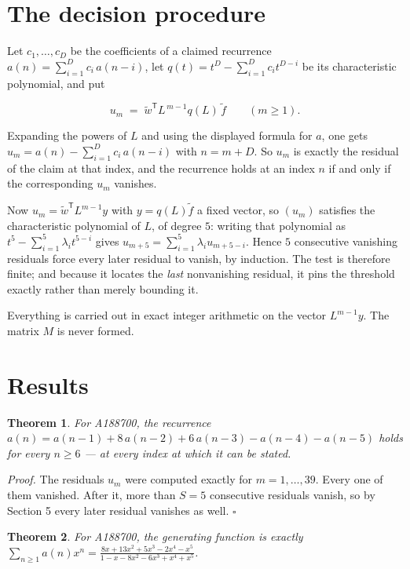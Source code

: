 \documentclass[11pt]{article}
\newtheorem{theorem}{Theorem}
\theoremstyle{definition}
\begin{document}
\section{The decision procedure}

Let $c_1,\dots,c_D$ be the coefficients of a claimed recurrence $a(n) = \sum_{i=1}^{D} c_i\,a(n-i)$, let $q(t) = t^{D} - \sum_{i=1}^{D} c_i t^{D-i}$ be its characteristic polynomial, and put

\[u_m \;=\; \tilde w^{\mathsf T} L^{\,m-1} q(L)\,\tilde f \qquad (m \ge 1).\]

Expanding the powers of $L$ and using the displayed formula for $a$, one gets $u_m = a(n) - \sum_{i=1}^{D} c_i\,a(n-i)$ with $n = m + D$. So $u_m$ is exactly the residual of the claim at that index, and the recurrence holds at an index $n$ if and only if the corresponding $u_m$ vanishes.

Now $u_m = \tilde w^{\mathsf T} L^{m-1} y$ with $y = q(L)\tilde f$ a fixed vector, so $(u_m)$ satisfies the characteristic polynomial of $L$, of degree $5$: writing that polynomial as $t^{5} - \sum_{i=1}^{5} \lambda_i t^{5-i}$ gives $u_{m+5} = \sum_{i=1}^{5} \lambda_i u_{m+5-i}$. Hence $5$ consecutive vanishing residuals force every later residual to vanish, by induction. The test is therefore finite; and because it locates the {\itshape last} nonvanishing residual, it pins the threshold exactly rather than merely bounding it.

Everything is carried out in exact integer arithmetic on the vector $L^{m-1}y$. The matrix $M$ is never formed.

\section{Results}

\begin{theorem} For A188700, the recurrence $a(n) = a(n-1) + 8\,a(n-2) + 6\,a(n-3) - a(n-4) - a(n-5)$ holds for every $n \ge 6$ --- at every index at which it can be stated.\end{theorem}

{\itshape Proof.} The residuals $u_m$ were computed exactly for $m = 1,\dots,39$. Every one of them vanished. After it, more than $S = 5$ consecutive residuals vanish, so by Section 5 every later residual vanishes as well. $\square$

\begin{theorem} For A188700, the generating function is exactly $\sum_{n\ge 1} a(n)x^n = \frac{8x + 13x^{2} + 5x^{3} - 2x^{4} - x^{5}}{1 - x - 8x^{2} - 6x^{3} + x^{4} + x^{5}}$.\end{theorem}
\end{document}
